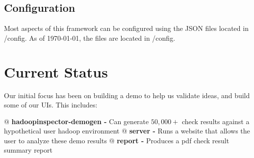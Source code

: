     \subsection{Configuration}
    Most aspects of this framework can be configured using the JSON files located in {\ttfamily /config}. As of \today,
    the files are located in {\ttfamily /config}.

\section{Current Status}
Our initial focus has been on building a demo to help us validate ideas, and build some of our UIs. This includes:

\begin{easylist}[itemize]
    @ \textbf{hadoopinspector-demogen -} Can generate $50,000+$ check results against a hypothetical user hadoop environment
    @ \textbf{server -} Runs a website that allows the user to analyze these demo results
    @ \textbf{report -} Produces a pdf check result summary report
\end{easylist}

